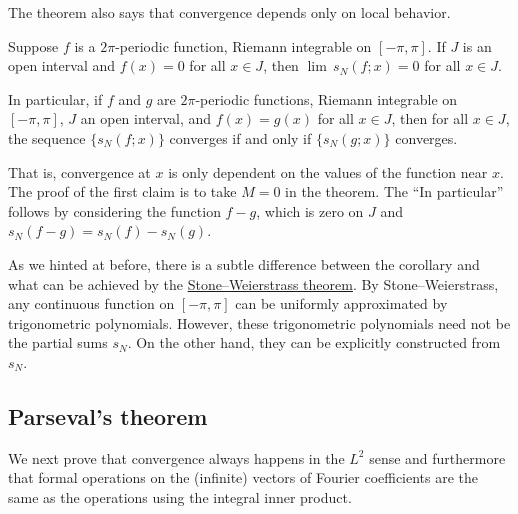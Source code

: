 The theorem also says that convergence depends only on local behavior.

\begin{cor}
Suppose $f$ is a $2\pi$-periodic function, Riemann integrable on $[-\pi,\pi]$.
If $J$ is an open interval and $f(x) = 0$ for all $x \in J$,
then $\lim\, s_N(f;x) = 0$ for all $x \in J$.

In particular, if $f$ and $g$ are $2\pi$-periodic functions,
Riemann integrable on $[-\pi,\pi]$, $J$ an open interval, and $f(x) = g(x)$
for all $x \in J$, then for all $x \in J$,
the sequence
$\{ s_N(f;x) \}$ converges if and only if $\{ s_N(g;x) \}$ converges.
\end{cor}

That is, convergence at $x$ is only dependent on the values of the function
near $x$.  The proof of the first claim is to take $M=0$ in the theorem.
The ``In particular'' follows by considering the function $f-g$, which
is zero on $J$ and $s_N(f-g) = s_N(f) - s_N(g)$.

As we hinted at before,
there is a subtle difference between the corollary and what can be
achieved by the \hyperref[thm:SWcomplex]{Stone--Weierstrass theorem}.
By Stone--Weierstrass, 
any continuous function on $[-\pi,\pi]$ can be uniformly approximated
by trigonometric polynomials.  However, these trigonometric polynomials need
not be the partial sums $s_N$.  On the other hand, they can be
explicitly constructed from $s_N$.

\subsection{Parseval's theorem}

We next prove that
convergence always happens in the $L^2$ sense and
furthermore that formal operations on the (infinite) vectors of
Fourier coefficients are the same as the operations using the integral
inner product.



